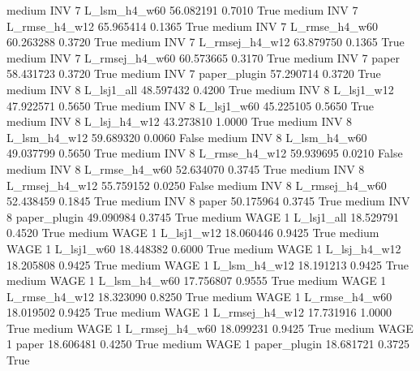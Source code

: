     medium      INV                 7   L_lsm_h4_w60  56.082191      0.7010    True
    medium      INV                 7  L_rmse_h4_w12  65.965414      0.1365    True
    medium      INV                 7  L_rmse_h4_w60  60.263288      0.3720    True
    medium      INV                 7 L_rmsej_h4_w12  63.879750      0.1365    True
    medium      INV                 7 L_rmsej_h4_w60  60.573665      0.3170    True
    medium      INV                 7          paper  58.431723      0.3720    True
    medium      INV                 7   paper_plugin  57.290714      0.3720    True
    medium      INV                 8     L_lsj1_all  48.597432      0.4200    True
    medium      INV                 8     L_lsj1_w12  47.922571      0.5650    True
    medium      INV                 8     L_lsj1_w60  45.225105      0.5650    True
    medium      INV                 8   L_lsj_h4_w12  43.273810      1.0000    True
    medium      INV                 8   L_lsm_h4_w12  59.689320      0.0060   False
    medium      INV                 8   L_lsm_h4_w60  49.037799      0.5650    True
    medium      INV                 8  L_rmse_h4_w12  59.939695      0.0210   False
    medium      INV                 8  L_rmse_h4_w60  52.634070      0.3745    True
    medium      INV                 8 L_rmsej_h4_w12  55.759152      0.0250   False
    medium      INV                 8 L_rmsej_h4_w60  52.438459      0.1845    True
    medium      INV                 8          paper  50.175964      0.3745    True
    medium      INV                 8   paper_plugin  49.090984      0.3745    True
    medium     WAGE                 1     L_lsj1_all  18.529791      0.4520    True
    medium     WAGE                 1     L_lsj1_w12  18.060446      0.9425    True
    medium     WAGE                 1     L_lsj1_w60  18.448382      0.6000    True
    medium     WAGE                 1   L_lsj_h4_w12  18.205808      0.9425    True
    medium     WAGE                 1   L_lsm_h4_w12  18.191213      0.9425    True
    medium     WAGE                 1   L_lsm_h4_w60  17.756807      0.9555    True
    medium     WAGE                 1  L_rmse_h4_w12  18.323090      0.8250    True
    medium     WAGE                 1  L_rmse_h4_w60  18.019502      0.9425    True
    medium     WAGE                 1 L_rmsej_h4_w12  17.731916      1.0000    True
    medium     WAGE                 1 L_rmsej_h4_w60  18.099231      0.9425    True
    medium     WAGE                 1          paper  18.606481      0.4250    True
    medium     WAGE                 1   paper_plugin  18.681721      0.3725    True

